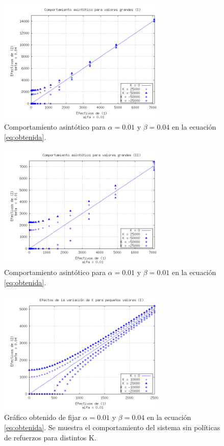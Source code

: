 \documentclass{sig-alternate}
\begin{document}
\begin{figure}[h]
\begin{center}
\includegraphics[width=8cm]{power_areas_1b}
\caption{\label{fig:asin1} Comportamiento asintótico para $\alpha = 0.01$ y $\beta = 0.04$ en la ecuación \ref{eq:obtenida}.}
\end{center}
\end{figure}
\begin{figure}[h]
\begin{center}
\includegraphics[width=8cm]{power_areas_2b}
\caption{\label{fig:asin2} Comportamiento asintótico para $\alpha = 0.01$ y $\beta = 0.01$ en la ecuación \ref{eq:obtenida}. }
\end{center}
\end{figure}
\begin{figure}[h]
\begin{center}
\includegraphics[width=8cm]{power_areas_1}
\caption{\label{fig:powerarea1} Gr\'afico obtenido de fijar $\alpha = 0.01$ y $\beta = 0.04$ en la ecuación \ref{eq:obtenida}. Se muestra el comportamiento del sistema sin políticas de refuerzos para distintos K.}
\end{center}
\end{figure}
\end{document}
